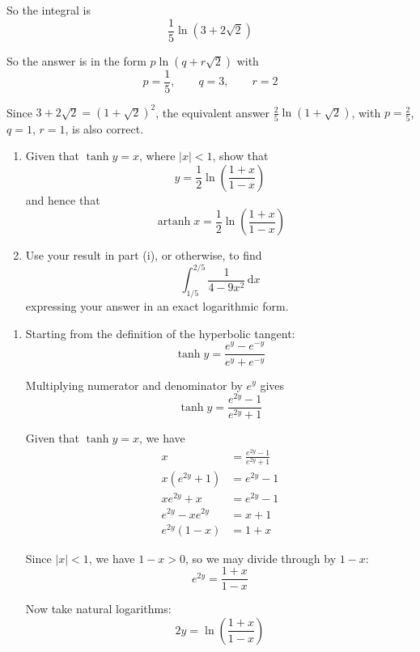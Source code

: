 \documentclass[leqno]{article}
\begin{document}
\begin{enumerate}[
  label=\textbf{\arabic*.},
  leftmargin=*,
  topsep=0pt,
  partopsep=0pt,
  parsep=0pt
]
\begin{djsSolution}
\begin{enumerate}[label=\textbf{(\alph*)}]
  So the integral is
  \[
  \frac15\ln(3+2\sqrt2)
  \]

  So the answer is in the form $p\ln(q+r\sqrt2)$ with
  \[
  p=\frac15,\qquad q=3,\qquad r=2
  \]

  Since \(3+2\sqrt2=(1+\sqrt2)^2\), the equivalent answer \(\frac25\ln(1+\sqrt2)\), with \(p=\frac25\), \(q=1\), \(r=1\), is also correct.
\end{enumerate}
\end{djsSolution}


\newpage

\questionitem

\begin{enumerate}[label=(\roman*)]
  \item Given that $\tanh y=x$, where $|x|<1$, show that
  \[
  y=\frac{1}{2}\ln\left(\frac{1+x}{1-x}\right)
  \]
  and hence that
  \[
  \operatorname{artanh}x=\frac{1}{2}\ln\left(\frac{1+x}{1-x}\right)
  \]
  \item Use your result in part (i), or otherwise, to find
  \[
  \int_{1/5}^{2/5} \frac{1}{4-9x^2}\,\mathrm{d}x
  \]
  expressing your answer in an exact logarithmic form.  \\
\end{enumerate}

\vspace*{10pt}

\begin{djsSolution}
\begin{enumerate}[label=\textbf{(\roman*)}]
\item Starting from the definition of the hyperbolic tangent:
\[
\tanh y=\frac{e^y-e^{-y}}{e^y+e^{-y}}
\]

Multiplying numerator and denominator by $e^y$ gives
\[
\tanh y=\frac{e^{2y}-1}{e^{2y}+1}
\]

Given that $\tanh y=x$, we have
\begin{align*}
x&=\frac{e^{2y}-1}{e^{2y}+1} \\
x(e^{2y}+1)&=e^{2y}-1 \\
xe^{2y}+x&=e^{2y}-1 \\
e^{2y}-xe^{2y}&=x+1 \\
e^{2y}(1-x)&=1+x
\end{align*}

Since $|x|<1$, we have $1-x>0$, so we may divide through by $1-x$:
\[
e^{2y}=\frac{1+x}{1-x}
\]

Now take natural logarithms:
\[
2y=\ln\left(\frac{1+x}{1-x}\right)
\]


\end{enumerate}
\end{djsSolution}
\end{enumerate}
\end{document}
